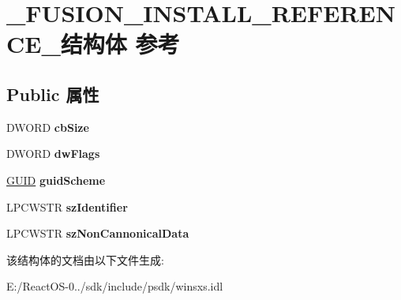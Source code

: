 \hypertarget{struct___f_u_s_i_o_n___i_n_s_t_a_l_l___r_e_f_e_r_e_n_c_e__}{}\section{\+\_\+\+F\+U\+S\+I\+O\+N\+\_\+\+I\+N\+S\+T\+A\+L\+L\+\_\+\+R\+E\+F\+E\+R\+E\+N\+C\+E\+\_\+结构体 参考}
\label{struct___f_u_s_i_o_n___i_n_s_t_a_l_l___r_e_f_e_r_e_n_c_e__}
\subsection*{Public 属性}
\begin{DoxyCompactItemize}
\item 
\mbox{\label{struct___f_u_s_i_o_n___i_n_s_t_a_l_l___r_e_f_e_r_e_n_c_e___aea78ee9d824989a4ae71d5dc86225bdd}} 
D\+W\+O\+RD {\bfseries cb\+Size}
\item 
\mbox{\label{struct___f_u_s_i_o_n___i_n_s_t_a_l_l___r_e_f_e_r_e_n_c_e___aacbd8404a948b216f46abc6898306c7c}} 
D\+W\+O\+RD {\bfseries dw\+Flags}
\item 
\mbox{\label{struct___f_u_s_i_o_n___i_n_s_t_a_l_l___r_e_f_e_r_e_n_c_e___a8a944ec766613e58db0580172743f42d}} 
\hyperlink{interface_g_u_i_d}{G\+U\+ID} {\bfseries guid\+Scheme}
\item 
\mbox{\label{struct___f_u_s_i_o_n___i_n_s_t_a_l_l___r_e_f_e_r_e_n_c_e___abca3f50adaef49f7c6a562c1dd7c1e85}} 
L\+P\+C\+W\+S\+TR {\bfseries sz\+Identifier}
\item 
\mbox{\label{struct___f_u_s_i_o_n___i_n_s_t_a_l_l___r_e_f_e_r_e_n_c_e___ad5409627ddd5a12be79095738923e23d}} 
L\+P\+C\+W\+S\+TR {\bfseries sz\+Non\+Cannonical\+Data}
\end{DoxyCompactItemize}


该结构体的文档由以下文件生成\+:\begin{DoxyCompactItemize}
\item 
E\+:/\+React\+O\+S-\/0../sdk/include/psdk/winsxs.\+idl\end{DoxyCompactItemize}
